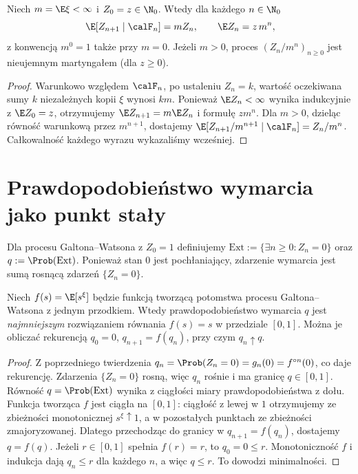 \begin{twierdzenie}
Niech $m=\E\xi<\infty$ i $Z_0=z\in\N_0$.
Wtedy dla każdego $n\in\N_0$
\[
\E[Z_{n+1}\mid\calF_n]=mZ_n,\qquad
\E Z_n=z\,m^n,
\]
z konwencją $m^0=1$ także przy $m=0$.
Jeżeli $m>0$, proces $(Z_n/m^n)_{n\ge0}$ jest
nieujemnym martyngałem (dla $z\ge0$).
\end{twierdzenie}
\begin{proof}
Warunkowo względem $\calF_n$, po ustaleniu $Z_n=k$,
wartość oczekiwana sumy $k$ niezależnych kopii $\xi$
wynosi $km$. Ponieważ $\E Z_n<\infty$ wynika
indukcyjnie z $\E Z_0=z$, otrzymujemy
$\E Z_{n+1}=m\E Z_n$ i formułę $zm^n$.
Dla $m>0$, dzieląc równość warunkową przez $m^{n+1}$,
dostajemy $\E[Z_{n+1}/m^{n+1}\mid\calF_n]=Z_n/m^n$.
Całkowalność każdego wyrazu wykazaliśmy wcześniej.
\end{proof}

\section{Prawdopodobieństwo wymarcia jako punkt stały}
\begin{definicja}[Wymarcie]
Dla procesu Galtona--Watsona z $Z_0=1$ definiujemy
$\mathrm{Ext}:=\{\exists n\ge0:Z_n=0\}$ oraz
$q:=\Prob(\mathrm{Ext})$.
Ponieważ stan $0$ jest pochłaniający,
zdarzenie wymarcia jest sumą rosnącą zdarzeń $\{Z_n=0\}$.
\end{definicja}

\begin{twierdzenie}
Niech $f(s)=\E[s^\xi]$ będzie funkcją tworzącą potomstwa
procesu Galtona--Watsona z jednym przodkiem.
Wtedy prawdopodobieństwo wymarcia $q$ jest
\emph{najmniejszym} rozwiązaniem równania $f(s)=s$
w przedziale $[0,1]$. Można je obliczać rekurencją
$q_0=0$, $q_{n+1}=f(q_n)$, przy czym
$q_n\uparrow q$.
\end{twierdzenie}
\begin{proof}
Z poprzedniego twierdzenia
$q_n=\Prob(Z_n=0)=g_n(0)=f^{\circ n}(0)$,
co daje rekurencję. Zdarzenia $\{Z_n=0\}$ rosną,
więc $q_n$ rośnie i ma granicę $q\in[0,1]$.
Równość $q=\Prob(\mathrm{Ext})$ wynika z ciągłości miary
prawdopodobieństwa z dołu.
Funkcja tworząca $f$ jest ciągła na $[0,1]$:
ciągłość z lewej w $1$ otrzymujemy ze zbieżności monotonicznej
$s^\xi\uparrow1$, a w pozostałych punktach ze zbieżności
zmajoryzowanej. Dlatego przechodząc do granicy w
$q_{n+1}=f(q_n)$, dostajemy $q=f(q)$.
Jeżeli $r\in[0,1]$ spełnia $f(r)=r$, to $q_0=0\le r$.
Monotoniczność $f$ i indukcja dają $q_n\le r$
dla każdego $n$, a więc $q\le r$. To dowodzi minimalności.
\end{proof}

